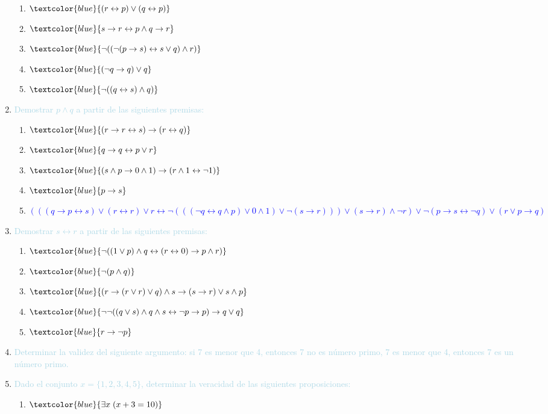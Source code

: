 \documentclass{article}
\newcommand{\lb}[1]{\textcolor{lightblue}{#1}}
\newcommand{\db}[1]{\textcolor{blue}{#1}}
\begin{document}
\begin{enumerate}[label=\color{red}\textbf{\arabic*)}, leftmargin=*]
      \begin{enumerate}[label=\color{red}\alph*)]
            \item $\db{(r\leftrightarrow p)\vee(q\leftrightarrow p)}$
            \item $\db{s\to r\leftrightarrow p\wedge q\to r}$
            \item $\db{\neg((\neg(p\to s)\leftrightarrow s\vee q)\wedge r)}$
            \item $\db{(\neg q\to q)\vee q}$
            \item $\db{\neg((q\leftrightarrow s)\wedge q)}$
      \end{enumerate}
      \item \lb{Demostrar $p\wedge q$ a partir de las siguientes premisas:}
      \begin{enumerate}[label=\color{red}\alph*)]
            \item $\db{(r\to r\leftrightarrow s)\to(r\leftrightarrow q)}$
            \item $\db{q\to q\leftrightarrow p\vee r}$
            \item $\db{(s\wedge p\to0\wedge 1)\to(r\wedge 1\leftrightarrow\neg1)}$
            \item $\db{p\to s}$
            \item \db{$(((q\to p\leftrightarrow s)\vee(r\leftrightarrow r)\vee r\leftrightarrow\neg(((\neg q\leftrightarrow q\wedge p)\vee0\wedge1)\vee\neg(s\to r)))\vee (s\to r)\wedge\neg r)\vee\neg(p\to s\leftrightarrow\neg q)\vee(r\vee p\to q)$}
      \end{enumerate}
      \item \lb{Demostrar $s\leftrightarrow r$ a partir de las siguientes premisas:}
      \begin{enumerate}[label=\color{red}\alph*)]
            \item $\db{\neg((1\vee p)\wedge q\leftrightarrow(r\leftrightarrow0)\to p\wedge r)}$
            \item $\db{\neg(p\wedge q)}$
            \item $\db{(r\to(r\vee r)\vee q)\wedge s\to(s\to r)\vee s\wedge p}$
            \item $\db{\neg\neg((q\vee s)\wedge q\wedge s\leftrightarrow\neg p\to p)\to q\vee q}$
            \item $\db{r\to\neg p}$
      \end{enumerate}
      \item \lb{Determinar la validez del siguiente argumento: si 7 es menor que 4, entonces 7 no es número primo, 7 es menor que 4, entonces 7 es un número primo.}
      \item \lb{Dado el conjunto $x=\{1,2,3,4,5\}$, determinar la veracidad de las siguientes proposiciones:}
      \begin{enumerate}[label=\color{red}\alph*)]
            \item $\db{\exists x\;(x+3=10)}$
            

\end{enumerate}
\end{enumerate}
\end{document}
